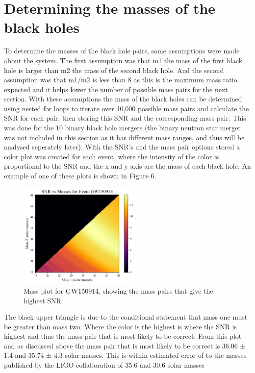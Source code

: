 \documentclass[]{article}
\begin{document}
\section*{Determining the masses of the black holes}
To determine the masses of the black hole pairs, some assumptions were made
about the system. The first assumption was that m1 the mass of the first black hole is larger
than m2 the mass of the second black hole. And the second assumption was that m1/m2 is less than 8
as this is the maximum mass ratio expected and it helps lower the number of possible mass pairs
for the next section. With these assumptions the mass of the black holes can be determined using
nested for loops to iterate over 10,000 possible mass pairs and calculate the SNR for each pair, then storing this
SNR and the corresponding mass pair. This was done for the 10 binary black hole mergers (the binary neutron star
merger was not included in this section as it has different mass ranges, and thus will be analysed seperately
later). With the SNR's and the mass pair options stored a color plot was created for each event, where
the intensity of the color is proportional to the SNR and the x and y axis are the mass of each black hole.
An example of one of these plots is shown in Figure 6.
\begin{figure}[h]
    \includegraphics[width=6cm]{images/snr_color.png}
    \caption{Mass plot for GW150914, showing the mass pairs that give the highest SNR}
    \label{fig:mass_plot}
\end{figure}
\newline
The black upper triangle is due to the conditional statement that mass one must be greater than mass two. Where the
color is the highest is where the SNR is highest and thus the mass pair that is most likely
to be correct. From this plot and as discussed above the mass pair that is most likely to
be correct is 36.06 ± 1.4 and 35.74 ± 4.3 solar masses. This is within estimated error of to the masses published
by the LIGO collaboration of 35.6 and 30.6 solar masses
\end{document}
